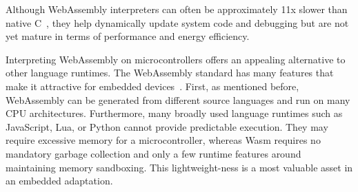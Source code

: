 Although WebAssembly interpreters can often be approximately 11x slower than native C~\cite{wasm3-performance}, they help dynamically update system code and debugging but are not yet mature in terms of performance and energy efficiency.

Interpreting WebAssembly on microcontrollers offers an appealing alternative to other language runtimes. The WebAssembly standard has many features that make it attractive for embedded devices~\cite{peach2020ewasm}. First, as mentioned before, WebAssembly can be generated from different source languages and run on many CPU architectures. Furthermore, many broadly used language runtimes such as JavaScript, Lua, or Python cannot provide predictable execution. They may require excessive memory for a microcontroller, whereas Wasm requires no mandatory garbage collection and only a few runtime features around maintaining memory sandboxing. This lightweight-ness is a most valuable asset in an embedded adaptation. \\




